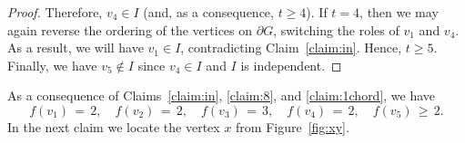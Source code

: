 \documentclass[11pt]{article}
\theoremstyle{slantthm}
\numberwithin{equation}{section}
\theoremstyle{definition}
\renewcommand{\geq}{\geqslant}
\numberwithin{equation}{section}
\newcommand{\0}{\varnothing}
\newcommand{\bdry}[1]{{\partial #1}}
\begin{document}
\begin{proof}
        Therefore, $v_4 \in I$ (and, as a consequence, $t \geq 4$). If $t = 4$, then we may again reverse the ordering of the vertices on $\bdry{G}$, switching the roles of $v_1$ and $v_4$. As a result, we will have $v_1 \in I$, contradicting Claim~\ref{claim:in}. Hence, $t \geq 5$. Finally, we have $v_5 \notin I$ since $v_4 \in I$ and $I$ is independent.
    \end{proof}

    As a consequence of Claims~\ref{claim:in}, \ref{claim:8}, and \ref{claim:1chord}, we have
    \[
        f(v_1) \,=\, 2, \quad f(v_2) \,=\, 2, \quad f(v_3) \,=\, 3, \quad f(v_4) \,=\, 2, \quad f(v_5) \,\geq\, 2.
    \]
    In the next claim we locate the vertex $x$ from Figure~\ref{fig:xy}.
\end{document}

